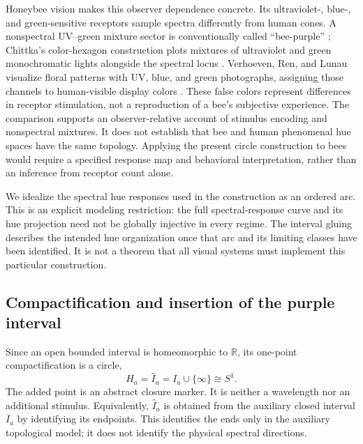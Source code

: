 \documentclass[11pt,letterpaper]{article}
\theoremstyle{plain}
\newcommand{\R}{\mathbb{R}}
\begin{document}
Honeybee vision makes this observer dependence concrete. Its ultraviolet-, blue-, and green-sensitive receptors sample spectra differently from human cones. A nonspectral UV--green mixture sector is conventionally called ``bee-purple'' \cite{Lunau2018}; Chittka's color-hexagon construction plots mixtures of ultraviolet and green monochromatic lights alongside the spectral locus \cite{Chittka1992}. Verhoeven, Ren, and Lunau visualize floral patterns with UV, blue, and green photographs, assigning those channels to human-visible display colors \cite{Lunau2018}. These false colors represent differences in receptor stimulation, not a reproduction of a bee's subjective experience. The comparison supports an observer-relative account of stimulus encoding and nonspectral mixtures. It does not establish that bee and human phenomenal hue spaces have the same topology. Applying the present circle construction to bees would require a specified response map and behavioral interpretation, rather than an inference from receptor count alone.

We idealize the spectral hue responses used in the construction as an ordered arc. This is an explicit modeling restriction: the full spectral-response curve and its hue projection need not be globally injective in every regime. The interval gluing describes the intended hue organization once that arc and its limiting classes have been identified. It is not a theorem that all visual systems must implement this particular construction.

\subsection{Compactification and insertion of the purple interval}
Since an open bounded interval is homeomorphic to $\R$, its one-point compactification is a circle,
\begin{equation}
 H_a=\widehat I_a=I_a\cup\{\infty\}\cong S^1.
 \label{eq:compactification}
\end{equation}
The added point is an abstract closure marker. It is neither a wavelength nor an additional stimulus. Equivalently, $\widehat I_a$ is obtained from the auxiliary closed interval $\overline I_a$ by identifying its endpoints. This identifies the ends only in the auxiliary topological model; it does not identify the physical spectral directions.
\end{document}
